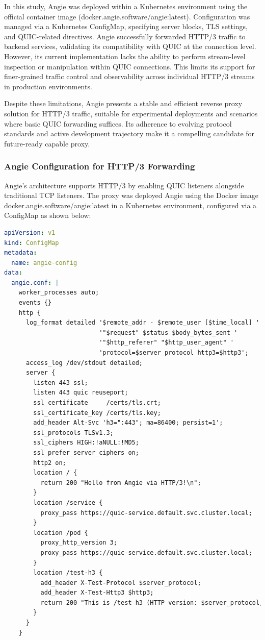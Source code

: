 In this study, Angie was deployed within a Kubernetes environment using the official container image (docker.angie.software/angie:latest). Configuration was managed via a Kubernetes ConfigMap, specifying server blocks, TLS settings, and QUIC-related directives. Angie successfully forwarded HTTP/3 traffic to backend services, validating its compatibility with QUIC at the connection level. However, its current implementation lacks the ability to perform stream-level inspection or manipulation within QUIC connections. This limits its support for finer-grained traffic control and observability across individual HTTP/3 streams in production environments.

Despite these limitations, Angie presents a stable and efficient reverse proxy solution for HTTP/3 traffic, suitable for experimental deployments and scenarios where basic QUIC forwarding suffices. Its adherence to evolving protocol standards and active development trajectory make it a compelling candidate for future-ready capable proxy.

\subsubsection{Angie Configuration for HTTP/3 Forwarding}
Angie's architecture supports HTTP/3 by enabling QUIC listeners alongside traditional TCP listeners. The proxy was deployed Angie using the Docker image docker.angie.software/angie:latest in a Kubernetes environment, configured via a ConfigMap as shown below:

\begin{lstlisting}[language=yaml]
apiVersion: v1
kind: ConfigMap
metadata:
  name: angie-config
data:
  angie.conf: |
    worker_processes auto;
    events {}
    http {
      log_format detailed '$remote_addr - $remote_user [$time_local] '
                          '"$request" $status $body_bytes_sent '
                          '"$http_referer" "$http_user_agent" '
                          'protocol=$server_protocol http3=$http3';
      access_log /dev/stdout detailed;
      server {
        listen 443 ssl;
        listen 443 quic reuseport;
        ssl_certificate     /certs/tls.crt;
        ssl_certificate_key /certs/tls.key;
        add_header Alt-Svc 'h3=":443"; ma=86400; persist=1';
        ssl_protocols TLSv1.3;
        ssl_ciphers HIGH:!aNULL:!MD5;
        ssl_prefer_server_ciphers on;
        http2 on;
        location / {
          return 200 "Hello from Angie via HTTP/3!\n";
        }
        location /service {
          proxy_pass https://quic-service.default.svc.cluster.local;
        }
        location /pod {
          proxy_http_version 3;
          proxy_pass https://quic-service.default.svc.cluster.local;
        }
        location /test-h3 {
          add_header X-Test-Protocol $server_protocol;
          add_header X-Test-Http3 $http3;
          return 200 "This is /test-h3 (HTTP version: $server_protocol, http3: $http3)\n";
        }
      }
    }
\end{lstlisting}

